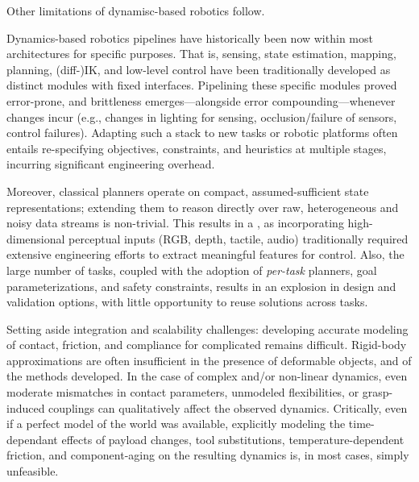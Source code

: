 Other limitations of dynamisc-based robotics follow.

Dynamics-based robotics pipelines have historically been  now within most architectures for specific purposes.
That is, sensing, state estimation, mapping, planning, (diff-)IK, and low-level control have been traditionally developed as distinct modules with fixed interfaces.
Pipelining these specific modules proved error-prone, and brittleness emerges---alongside error compounding---whenever changes incur (e.g., changes in lighting for sensing, occlusion/failure of sensors, control failures).
Adapting such a stack to new tasks or robotic platforms often entails re-specifying objectives, constraints, and heuristics at multiple stages, incurring significant engineering overhead.

Moreover, classical planners operate on compact, assumed-sufficient state representations; extending them to reason directly over raw, heterogeneous and noisy data streams is non-trivial.
This results in a , as incorporating high-dimensional perceptual inputs (RGB, depth, tactile, audio) traditionally required extensive engineering efforts to extract meaningful features for control. 
Also, the large number of tasks, coupled with the adoption of \emph{per-task} planners, goal parameterizations, and safety constraints, results in an explosion in design and validation options, with little opportunity to reuse solutions across tasks.

Setting aside integration and scalability challenges: developing accurate modeling of contact, friction, and compliance for complicated remains difficult.
Rigid-body approximations are often insufficient in the presence of deformable objects, and  of the methods developed.
In the case of complex and/or non-linear dynamics, even moderate mismatches in contact parameters, unmodeled flexibilities, or grasp-induced couplings can qualitatively affect the observed dynamics.
Critically, even if a perfect model of the world was available, explicitly modeling the time-dependant effects of payload changes, tool substitutions, temperature-dependent friction, and component-aging on the resulting dynamics is, in most cases, simply unfeasible.

